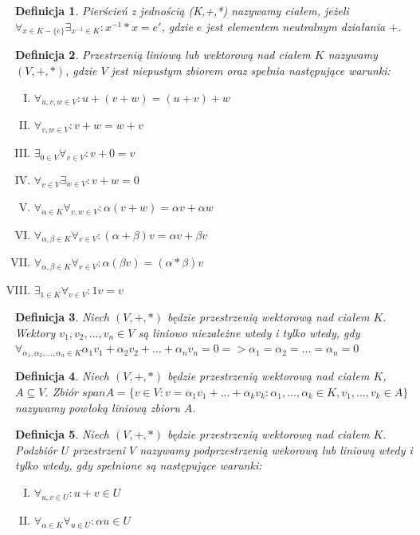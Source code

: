\documentclass[12pt,a4paper]{article}
\newtheorem{df}{Definicja}[section]
\begin{document}
\begin{df} 
Pier\'scie\'n z jedno\'sci\k{a} (K,+,*) nazywamy cia{\l}em, je\.zeli $\forall_{x\in K-\{e\}} \exists_{x^{-1}\in K}: x^{-1}*x=e'$, gdzie $e$ jest elementem neutralnym działania $+$.
\end{df}
\begin{df}
Przestrzeni\k{a} liniow\k{a} lub wektorow\k{a} nad cia{\l}em $K$ nazywamy $(V, +, *)$, gdzie $V$ jest niepustym zbiorem oraz spe{\l}nia nast\k{e}puj\k{a}ce warunki:
\begin{enumerate}[I.]
\item $\forall_{u, v, w \in V}: u + (v + w) = (u + v) + w$
\item $\forall_{v, w \in V}: v + w = w + v$
\item $\exists_{0 \in V} \forall_{v \in V}: v + 0 = v$
\item $\forall_{v \in V} \exists_{w \in V}: v + w = 0$
\item $\forall_{\alpha \in K} \forall_{v, w \in V}: \alpha(v + w) = \alpha v + \alpha w$
\item $\forall_{\alpha, \beta \in K} \forall_{v \in V}: (\alpha + \beta)v = \alpha v + \beta v$
\item $\forall_{\alpha, \beta \in K} \forall_{v \in V}: \alpha(\beta v) = (\alpha*\beta)v$
\item $\exists_{1 \in K} \forall_{v \in V}: 1v = v$
\end{enumerate}
\end{df}
\begin{df}
Niech $(V,+,*)$ b\k{e}dzie przestrzeni\k{a} wektorow\k{a} nad cia{\l}em $K$. Wektory $v_{1}, v_{2}, \dots, v_{n}\in V$ s\k{a} liniowo niezale\.{z}ne wtedy i tylko wtedy, gdy $\forall_{\alpha_{1}, \alpha_{2}, \dots, \alpha_{n} \in K} \alpha_{1}v_{1} + \alpha_{2}v_{2} + \dots + \alpha_{n}v_{n} = 0 => \alpha_{1} = \alpha_{2} = \dots = \alpha_{n} = 0$
\end{df}
\begin{df}
Niech $(V, +, *)$ b\k{e}dzie przestrzeni\k{a} wektorow\k{a} nad cia{\l}em $K$, $A\subseteq V$. Zbi\'or $spanA=\{v\in V: v=\alpha_{1}v_{1}+\ldots+\alpha_{k}v_{k}: \alpha_{1},\ldots,\alpha_{k}\in K, v_{1},\ldots,v_{k}\in A\}$ nazywamy pow{\l}ok\k{a} liniow\k{a} zbioru $A$.
\end{df}
\begin{df}
Niech $(V, +, *)$ b\k{e}dzie przestrzeni\k{a} wektorow\k{a} nad cia{\l}em $K$. Podzbi\'or $U$ przestrzeni $V$ nazywamy podprzestrzeni\k{a} wekorow\k{a} lub liniow\k{a} wtedy i tylko wtedy, gdy spe{\l}nione s\k{a} nast\k{e}puj\k{a}ce warunki:
\begin{enumerate}[I.]
\item $\forall_{u,v\in U}: u+v\in U$ 
\item $\forall_{\alpha\in K}\forall_{u\in U}: \alpha u\in U$
\end{enumerate}
\end{df}
\end{document}
